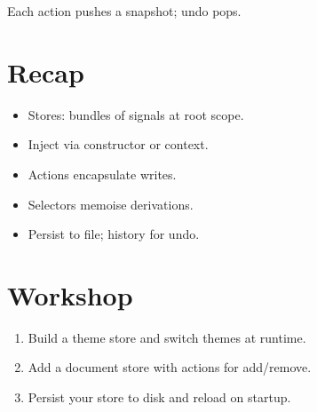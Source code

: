 Each action pushes a snapshot; undo pops.

\section{Recap}

\begin{recap}
\begin{itemize}[leftmargin=*]
  \item Stores: bundles of signals at root scope.
  \item Inject via constructor or context.
  \item Actions encapsulate writes.
  \item Selectors memoise derivations.
  \item Persist to file; history for undo.
\end{itemize}
\end{recap}

\section*{Workshop}

\begin{enumerate}[leftmargin=*]
  \item Build a theme store and switch themes at runtime.
  \item Add a document store with actions for add/remove.
  \item Persist your store to disk and reload on startup.
\end{enumerate}
